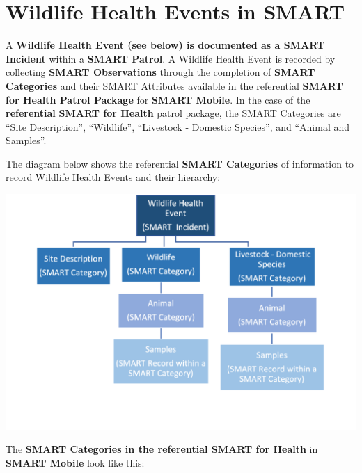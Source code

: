 \documentclass[
  letterpaper,
  DIV=11,
  numbers=noendperiod]{scrreprt}
\begin{document}
\hypertarget{wildlife-health-events-in-smart}{%
\section*{Wildlife Health Events in
SMART}\label{wildlife-health-events-in-smart}}


A \textbf{Wildlife Health Event (see below) is documented as a SMART
Incident} within a \textbf{SMART Patrol}. A Wildlife Health Event is
recorded by collecting \textbf{SMART Observations} through the
completion of \textbf{SMART Categories} and their SMART Attributes
available in the referential \textbf{SMART for Health Patrol Package}
for \textbf{SMART Mobile}. In the case of the \textbf{referential}
\textbf{SMART for Health} patrol package, the SMART Categories are
``Site Description'', ``Wildlife'', ``Livestock - Domestic Species'',
and ``Animal and Samples''.

The diagram below shows the referential \textbf{SMART Categories} of
information to record Wildlife Health Events and their hierarchy:

\includegraphics{Pictures_for_manual/Picture3.png}

The \textbf{SMART Categories in the referential SMART for Health} in
\textbf{SMART Mobile} look like this:
\end{document}
